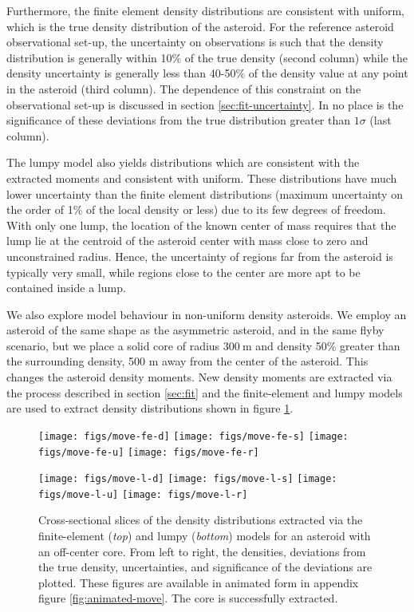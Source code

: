 \documentclass[fleqn,usenatbib]{mnras}
\begin{document}
Furthermore, the finite element density distributions are consistent with uniform, which is the true density distribution of the asteroid. For the reference asteroid observational set-up, the uncertainty on observations is such that the density distribution is generally within 10\% of the true density (second column) while the density uncertainty is generally less than 40-50\% of the density value at any point in the asteroid (third column). The dependence of this constraint on the observational set-up is discussed in section \ref{sec:fit-uncertainty}. In no place is the significance of these deviations from the true distribution greater than $1 \sigma$ (last column).

The lumpy model also yields distributions which are consistent with the extracted moments and consistent with uniform. These distributions have much lower uncertainty than the finite element distributions (maximum uncertainty on the order of 1\% of the local density or less) due to its few degrees of freedom. With only one lump, the location of the known center of mass requires that the lump lie at the centroid of the asteroid center with mass close to zero and unconstrained radius. Hence, the uncertainty of regions far from the asteroid is typically very small, while regions close to the center are more apt to be contained inside a lump.

We also explore model behaviour in non-uniform density asteroids. We employ an asteroid of the same shape as the asymmetric asteroid, and in the same flyby scenario, but we place a solid core of radius $\SI{300}{\meter}$ and density 50\% greater than the surrounding density, 500 m away from the center of the asteroid. This changes the asteroid density moments. New density moments are extracted via the process described in section \ref{sec:fit} and the finite-element and lumpy models are used to extract density distributions shown in figure \ref{fig:den-move}.

\begin{figure}
  \texttt{[image: figs/move-fe-d]}\hfill
  \texttt{[image: figs/move-fe-s]}\hfill
  \texttt{[image: figs/move-fe-u]}\hfill
  \texttt{[image: figs/move-fe-r]}

  \texttt{[image: figs/move-l-d]}\hfill
  \texttt{[image: figs/move-l-s]}\hfill
  \texttt{[image: figs/move-l-u]}\hfill
  \texttt{[image: figs/move-l-r]}

  \caption{Cross-sectional slices of the density distributions extracted via the finite-element (\textit{top}) and lumpy (\textit{bottom}) models for an asteroid with an off-center core. From left to right, the densities, deviations from the true density, uncertainties, and significance of the deviations are plotted. These figures are available in animated form in appendix figure \ref{fig:animated-move}. The core is successfully extracted.}
  \label{fig:den-move}
\end{figure}
\end{document}
